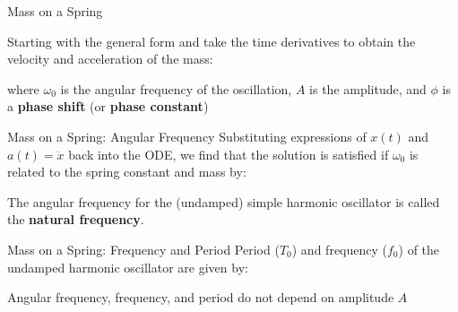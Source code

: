 \documentclass[12pt,compress,aspectratio=169]{beamer}
\begin{document}
\begin{frame}{Mass on a Spring}

  
  Starting with the general form and take the time derivatives to obtain the
  velocity and acceleration of the mass:
 
  \vspace{-.35in}{\Large
    \begin{align*}
      x(t)&=A\cos(\omega_0 t-\phi)\\
      v(t)&=-A\omega_0\sin(\omega_0 t-\phi)\\
      a(t)&=-A\omega_0^2\cos(\omega_0 t-\phi)=-\omega_0^2x
    \end{align*}
  }
  
  \vspace{-.2in}where $\omega_0$ is the angular frequency of the oscillation,
  $A$ is the amplitude, and $\phi$ is a \textbf{phase shift} (or
  \textbf{phase constant})%
\end{frame}



\begin{frame}{Mass on a Spring: Angular Frequency}
  Substituting expressions of $x(t)$ and $a(t)=\ddot x$ back into the ODE, we
  find that the solution is satisfied if $\omega_0$ is related to the spring
  constant and mass by:


  The angular frequency for the (undamped) simple harmonic oscillator is called
  the \textbf{natural frequency}.
\end{frame}



\begin{frame}{Mass on a Spring: Frequency and Period}
  Period ($T_0$) and frequency ($f_0$) of the undamped harmonic oscillator are
  given by:

  
  Angular frequency, frequency, and period do not depend on amplitude $A$
\end{frame}
\end{document}
